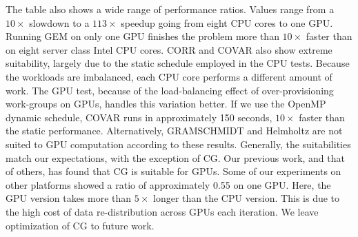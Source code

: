 The table also shows a wide range of performance ratios. Values range from a
$10\times$ slowdown to a $113\times$ speedup going from eight CPU cores to one
GPU. Running GEM on only one GPU finishes the problem more than $10 \times$
faster than on eight server class Intel CPU cores. CORR and COVAR also show
extreme suitability, largely due to the static schedule employed in the CPU
tests. Because the workloads are imbalanced, each CPU core performs a
different amount of work. The GPU test, because of the load-balancing effect
of over-provisioning work-groups on GPUs, handles this variation better. If we
use the OpenMP dynamic schedule, COVAR runs in approximately 150 seconds, $10
\times$ faster than the static performance.  Alternatively, GRAMSCHMIDT and
Helmholtz are not suited to GPU computation according to these results.
Generally, the suitabilities match our expectations, with the exception of CG.
Our previous work, and that of others, has found that CG is suitable for GPUs.
Some of our experiments on other platforms showed a ratio of approximately
0.55 on one GPU. Here, the GPU version takes more than $5 \times$ longer than
the CPU version. This is due to the high cost of data re-distribution across
GPUs each iteration. We leave optimization of CG to future work.


